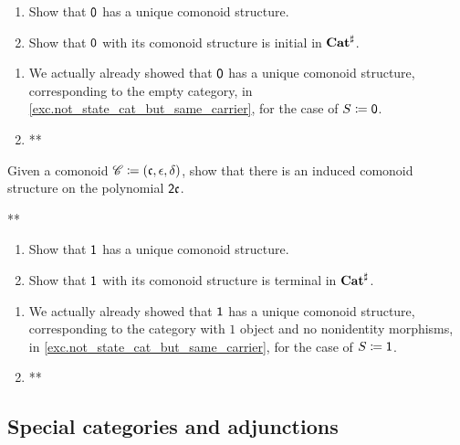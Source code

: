 \documentclass[Book-Poly]{subfiles}
\begin{document}
\begin{exercise}\label{exc.0_initial_com}
\begin{enumerate}
	\item Show that $\textsf{0}$ has a unique comonoid structure.
	\item Show that $\textsf{0}$ with its comonoid structure is initial in $\mathbf{Cat}^\sharp$.
\qedhere
\end{enumerate}
\begin{solution}
\begin{enumerate}
    \item We actually already showed that $\textsf{0}$ has a unique comonoid structure, corresponding to the empty category, in \cref{exc.not_state_cat_but_same_carrier}, for the case of $S\coloneqq\textsf{0}$.
    \item **
\end{enumerate}
\end{solution}
\end{exercise}

\begin{exercise}
Given a comonoid $\mathscr{C}\coloneqq(\mathfrak{c},\epsilon,\delta)$, show that there is an induced comonoid structure on the polynomial $\textsf{2}\mathfrak{c}$.
\begin{solution}
**
\end{solution}
\end{exercise}

\begin{exercise}
\begin{enumerate}
	\item Show that $\textsf{1}$ has a unique comonoid structure.
	\item Show that $\textsf{1}$ with its comonoid structure is terminal in $\mathbf{Cat}^\sharp$.
\qedhere
\end{enumerate}
\begin{solution}
\begin{enumerate}
    \item We actually already showed that $\textsf{1}$ has a unique comonoid structure, corresponding to the category with $1$ object and no nonidentity morphisms, in \cref{exc.not_state_cat_but_same_carrier}, for the case of $S\coloneqq\textsf{1}$.
    \item **
\end{enumerate}
\end{solution}
\end{exercise}

\subsection{Special categories and adjunctions}
\end{document}
